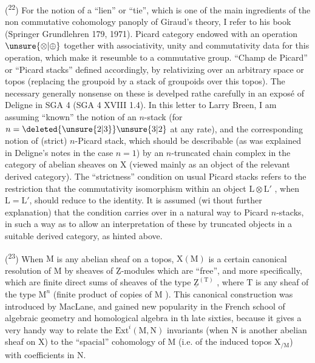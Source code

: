 
(\textsuperscript{22}) For the notion of a ``lien'' or ``tie'', which is one of the main ingredients of the non commutative cohomology panoply of Giraud's theory, I refer to his book (Springer Grundlehren 179, 1971).  Picard category  endowed with an operation $\unsure{\otimes|\oplus}$  together with associativity, unity and commutativity data for this operation, which make it reseumble to a commutative group.  ``Champ de Picard'' or ``Picard stacks''  defined accordingly, by relativizing over an arbitrary space or topos (replacing the groupoid by a stack of groupoids over this topos). The necessary generally nonsense on these is develped rathe carefully in an exposé of Deligne in SGA 4 (SGA 4 XVIII 1.4). In this letter to Larry Breen, I am assuming ``known'' the notion of an $n$-stack (for $n=\deleted{\unsure{2|3}}\unsure{3|2}$ at any rate), and the corresponding notion of (strict) $n$-Picard stack, which should be describable (as was explained in Deligne's notes in the case $n=1$) by an $n$-truncated chain complex in the category of abelian sheaves on $\mathrm{X}$ (viewed mainly as an object of the relevant derived category). The ``strictness'' condition on usual Picard stacks refers to the restriction that the commutativity isomorphism within an object $\mathrm{L}\otimes\mathrm{L}'$ ,  when $\mathrm{L}=\mathrm{L}'$, should reduce to the identity. It is assumed (wi thout further explanation) that the condition carries over in a natural way to Picard $n$-stacks, in such a way as to allow an interpretation of these by truncated objects in a suitable derived category, as hinted above.

(\textsuperscript{23}) When $\mathrm{M}$ is any abelian sheaf on a topos, $\mathrm{X}(\mathrm{M})$ is a certain canonical  resolution of $\mathrm{M}$ by sheaves of $\underline{\mathrm{Z}}$-modules which are ``free'', and more specifically, which are finite direct sums of sheaves of the type $\underline{\mathrm{Z}}^{(\mathrm{T})}$ , where $\mathrm{T}$ is any sheaf of the type $\mathrm{M}^{n}$ (finite product of copies of $\mathrm{M}$ ). This canonical construction was introduced  by MacLane, and gained new popularity in the French school of algebraic geometry and homological algebra in th late sixties, because  it gives a very handy way to relate the $\mathrm{Ext}^{i}(\mathrm{M},\mathrm{N})$ invariants (when $\mathrm{N}$ is another abelian sheaf on $\mathrm{X}$) to the  ``spacial'' cohomology of $\mathrm{M}$ (i.e. of the induced topos $\mathrm{X}_{/\mathrm{M}}$\deleted{\unsure{,}}) with coefficients in $\mathrm{N}$.

